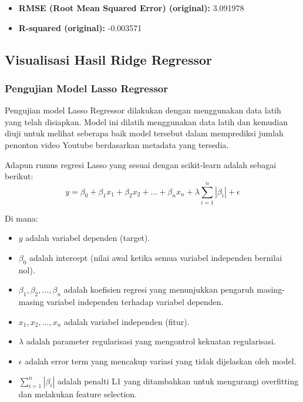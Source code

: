 \begin{itemize}
    \item \textbf{RMSE (Root Mean Squared Error) (original):} 3.091978
    \item \textbf{R-squared (original):} -0.003571
\end{itemize}

\subsection{Visualisasi Hasil Ridge Regressor}

\lipsum[3-4]

\subsubsection{Pengujian Model Lasso Regressor}
Pengujian model Lasso Regressor dilakukan dengan menggunakan data latih yang telah disiapkan. Model ini dilatih menggunakan data latih dan kemudian diuji untuk melihat seberapa baik model tersebut dalam memprediksi jumlah penonton video Youtube berdasarkan metadata yang tersedia.

Adapun rumus regresi Lasso yang sesuai dengan scikit-learn adalah sebagai berikut:
\begin{equation}
    y = \beta_0 + \beta_1 x_1 + \beta_2 x_2 + ... + \beta_n x_n + \lambda \sum_{i=1}^{n} |\beta_i| + \epsilon
\end{equation}

Di mana:
\begin{itemize}
    \item $y$ adalah variabel dependen (target).
    \item $\beta_0$ adalah intercept (nilai awal ketika semua variabel independen bernilai nol).
    \item $\beta_1, \beta_2, ..., \beta_n$ adalah koefisien regresi yang menunjukkan pengaruh masing-masing variabel independen terhadap variabel dependen.
    \item $x_1, x_2, ..., x_n$ adalah variabel independen (fitur).
    \item $\lambda$ adalah parameter regularisasi yang mengontrol kekuatan regularisasi.
    \item $\epsilon$ adalah error term yang mencakup variasi yang tidak dijelaskan oleh model.
    \item $\sum_{i=1}^{n} |\beta_i|$ adalah penalti L1 yang ditambahkan untuk mengurangi overfitting dan melakukan feature selection.
\end{itemize}

